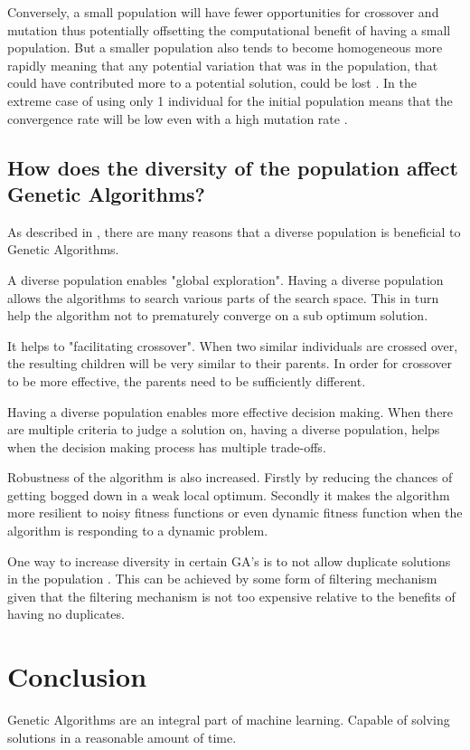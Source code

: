 \documentclass[12pt,a4paper]{report}
\begin{document}
Conversely, a small population will have fewer opportunities for crossover and mutation thus potentially offsetting the computational benefit of having a small population. But a smaller population  also tends to become homogeneous more rapidly meaning that any potential variation that was in the population, that could have contributed more to a potential solution, could be lost \citep{de1990analysis}. In the extreme case of using only 1 individual for the initial population means that the convergence rate will be low even with a high mutation rate \citep{whit}.  

 


\subsection{How does the diversity of the population affect Genetic Algorithms?}

As described in \cite{sud}, there are many reasons that a diverse population is beneficial to Genetic Algorithms. 

A diverse population enables "global exploration". Having a diverse population allows the algorithms to search various parts of the search space. This in turn help the algorithm not to prematurely converge on a sub optimum solution.

It helps to "facilitating crossover". When two similar individuals are crossed over, the resulting children will be very similar to their parents. In order for crossover to be more effective, the parents need to be sufficiently different.

Having a diverse population enables more effective decision making. When there are multiple criteria to judge a solution on, having a diverse population, helps when the  decision making process has multiple trade-offs. 

Robustness of the algorithm is also increased. Firstly by reducing the chances of getting bogged down in a weak local optimum. Secondly it makes the algorithm more resilient to noisy fitness functions or even dynamic fitness function when the algorithm is responding to a dynamic problem.
 
One way to increase diversity in certain GA's is to not allow duplicate solutions in the population \citep{sud}. This can be achieved by some form of filtering mechanism given that the filtering mechanism is not too expensive relative to the benefits of having no duplicates.



\section{Conclusion}

Genetic Algorithms are an integral part of machine learning. Capable of solving solutions in a reasonable amount of time.

\end{document}
